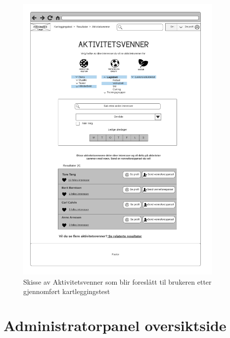 \begin{figure}[H]
\centering
\includegraphics[width=0.9\textwidth]{Illustrasjoner/Skisser/2.0/2-14-aktivitetsvenner-kartlegging.png}
\caption{Skisse av Aktivitetsvenner som blir foreslått til brukeren etter gjennomført kartleggingstest}
\label{vedlegg:2-14-aktivitetsvenn-kartlegging}
\end{figure}

\section{Administratorpanel oversiktside}

